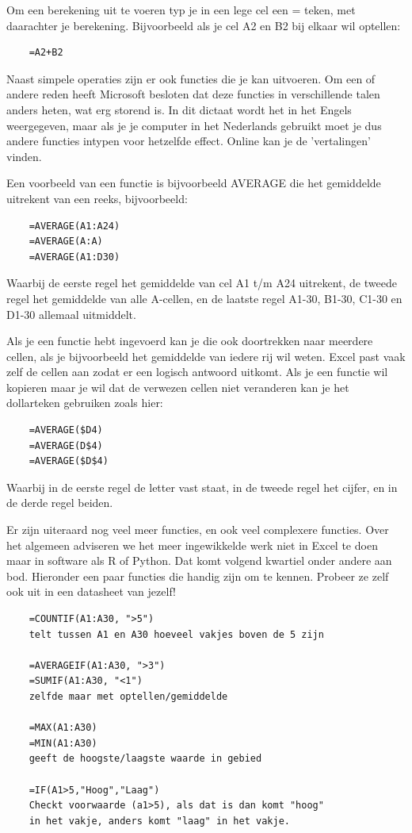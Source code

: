 Om een berekening uit te voeren typ je in een lege cel een = teken, met daarachter je berekening. Bijvoorbeeld als je cel A2 en B2 bij elkaar wil optellen:

\begin{verbatim}
    =A2+B2
\end{verbatim}

Naast simpele operaties zijn er ook functies die je kan uitvoeren. Om een of andere reden heeft Microsoft besloten dat deze functies in verschillende talen anders heten, wat erg storend is. In dit dictaat wordt het in het Engels weergegeven, maar als je je computer in het Nederlands gebruikt moet je dus andere functies intypen voor hetzelfde effect. Online kan je de 'vertalingen' vinden. 

Een voorbeeld van een functie is bijvoorbeeld AVERAGE die het gemiddelde uitrekent van een reeks, bijvoorbeeld:
\begin{verbatim}
    =AVERAGE(A1:A24)
    =AVERAGE(A:A)
    =AVERAGE(A1:D30)
\end{verbatim}
Waarbij de eerste regel het gemiddelde van cel A1 t/m A24 uitrekent, de tweede regel het gemiddelde van alle A-cellen, en de laatste regel A1-30, B1-30, C1-30 en D1-30 allemaal uitmiddelt. 

Als je een functie hebt ingevoerd kan je die ook doortrekken naar meerdere cellen, als je bijvoorbeeld het gemiddelde van iedere rij wil weten. Excel past vaak zelf de cellen aan zodat er een logisch antwoord uitkomt. Als je een functie wil kopieren maar je wil dat de verwezen cellen niet veranderen kan je het dollarteken gebruiken zoals hier:
\begin{verbatim}
    =AVERAGE($D4)
    =AVERAGE(D$4)
    =AVERAGE($D$4)
\end{verbatim}
Waarbij in de eerste regel de letter vast staat, in de tweede regel het cijfer, en in de derde regel beiden.

Er zijn uiteraard nog veel meer functies, en ook veel complexere functies. Over het algemeen adviseren we het meer ingewikkelde werk niet in Excel te doen maar in software als R of Python. Dat komt volgend kwartiel onder andere aan bod. Hieronder een paar functies die handig zijn om te kennen. Probeer ze zelf ook uit in een datasheet van jezelf!

\begin{verbatim}
    =COUNTIF(A1:A30, ">5")
    telt tussen A1 en A30 hoeveel vakjes boven de 5 zijn
    
    =AVERAGEIF(A1:A30, ">3")
    =SUMIF(A1:A30, "<1")
    zelfde maar met optellen/gemiddelde
    
    =MAX(A1:A30)
    =MIN(A1:A30)
    geeft de hoogste/laagste waarde in gebied
    
    =IF(A1>5,"Hoog","Laag")
    Checkt voorwaarde (a1>5), als dat is dan komt "hoog"
    in het vakje, anders komt "laag" in het vakje.
\end{verbatim}

